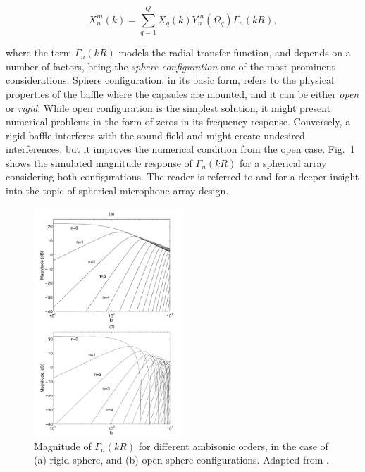 \begin{equation}
	X_n^m(k) = \sum_{q=1}^{Q} X_q(k) Y_n^m(\Omega_q) \Gamma_n(kR),
	\label{eq:a2b}
\end{equation}

where the term $\Gamma_n(kR)$ models the radial transfer function, and depends on a number of factors, being the \textit{sphere configuration} one of the most prominent considerations. 
Sphere configuration, in its basic form, refers to the physical properties of the baffle where the capsules are mounted, and it can be either \textit{open} or \textit{rigid}. 
While open configuration is the simplest solution, it might present numerical problems in the form of zeros in its frequency response. Conversely, a rigid baffle interferes with the sound field and might create undesired interferences, but it improves the numerical condition from the open case. Fig.~\ref{fig:magnitude_kr} shows the simulated magnitude response of $\Gamma_n(kR)$  for a spherical array considering both configurations. 
The reader is referred to \cite{moreau20063d} and \cite{rafaely2004analysis}  for a deeper insight into the topic of spherical microphone array design.

%


\begin{figure}[ht]
\begin{center}
  \includegraphics[width=0.5\textwidth]{Figures/ScientificBackground/magnitude_kr.png}
  \caption{Magnitude of $\Gamma_n(kR)$ for different ambisonic orders, in the case of (a) rigid sphere, and (b) open sphere configurations. Adapted from \cite{rafaely2004analysis}. }
	\label{fig:magnitude_kr}
	\end{center}
\end{figure}



